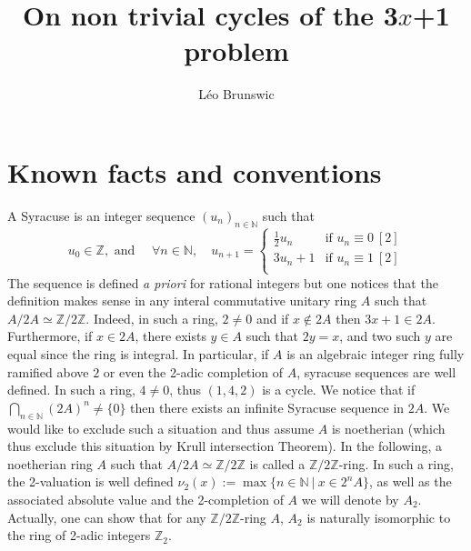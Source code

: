 \documentclass[12pt,a4paper]{article}
\author{Léo Brunswic}
\title{On non trivial cycles of the 3$x$+1 problem}
\def\NN{\mathbb{N}}
\def\ZZ{\mathbb{Z}}
\begin{document}
\maketitle
{}

\section{Known facts and conventions}
A Syracuse is an integer sequence $(u_n)_{n\in\NN}$ such that   $$u_0\in \ZZ, \text{ and }\quad \forall n\in \NN,\quad u_{n+1}=\left\{\begin{array}{ll}
\displaystyle \frac{1}{2}u_{n} & \text{if }u_n \equiv 0~[2]\\
\displaystyle 3u_n+1&\text{if }u_n \equiv 1~[2]\\
\end{array}\right.$$
The sequence is defined {\it a priori} for rational integers but one notices that the definition makes sense in any interal commutative unitary ring $A$ such that $A/2A \simeq \ZZ/2\ZZ$.  Indeed, in such a ring, $2\neq 0$ and if $x\notin 2A$ then $3x+1\in 2A$. Furthermore, if $x\in 2A$, there exists $y\in A$ such that $2y=x$, and two such $y$ are equal since the ring is integral.  In particular, if $A$ is an algebraic integer ring  fully ramified above $2$ or even the 2-adic completion  of $A$, syracuse sequences are well defined. In such a ring, $4\neq 0$, thus $(1,4,2)$ is a cycle.
We notice that if $\bigcap_{n\in \NN} (2A)^n \neq \{0\}$ then there exists an infinite Syracuse sequence in $2A$. We would like to exclude such a situation and thus assume $A$ is noetherian (which thus exclude this situation by Krull intersection Theorem).
In the following, a noetherian ring $A$ such that $A/2A \simeq \ZZ/2\ZZ$ is called a $\ZZ/2\ZZ$-ring. In such a ring, the 2-valuation is well defined $\nu_2(x):= \max \{n\in \NN ~|~ x\in 2^n A\}$, as well as the associated absolute value and the 2-completion of $A$ we will denote by $A_2$. Actually, one can show that for any $\ZZ/2\ZZ$-ring $A$, $A_2$ is naturally isomorphic to the ring of 2-adic integers $\ZZ_2$.
\end{document}
